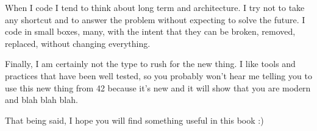 When I code I tend to think about long term and architecture. I try
not to take any shortcut and to answer the problem without expecting
to solve the future. I code in small boxes, many, with the intent that
they can be broken, removed, replaced, without changing everything.

Finally, I am certainly not the type to rush for the new thing. I like
tools and practices that have been well tested, so you probably won't
hear me telling you to use this new thing from \cpp{}42 because it's
new and it will show that you are modern and blah blah blah.

\bigskip

That being said, I hope you will find something useful in this book :)

\renewcommand*\thesection{\arabic{chapter}.\arabic{section}}
